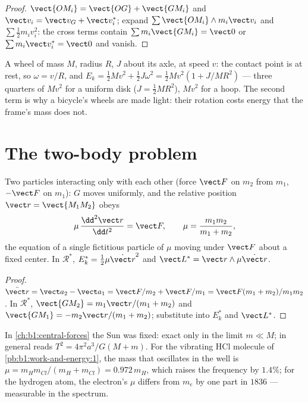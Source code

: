 \begin{proof}
$\vect{OM_i} = \vect{OG} + \vect{GM_i}$ and $\vect v_i = \vect v_G + \vect v_i^*$;
expand $\sum\vect{OM_i}\wedge m_i\vect v_i$ and $\sum\tfrac12 m_iv_i^2$: the cross
terms contain $\sum m_i\vect{GM_i} = \vect 0$ or $\sum m_i\vect v_i^* = \vect 0$
and vanish.
\end{proof}

\begin{example}\label{ex:b1:systems-of-points:rolling}
A wheel of mass $M$, radius $R$,  $J$ about its axle,
 at speed $v$: the contact point is at rest, so
$\omega = v/R$, and $E_k = \tfrac12 Mv^2 + \tfrac12 J\omega^2 = \tfrac12 Mv^2(1 +
J/MR^2)$ --- three quarters of $Mv^2$ for a uniform disk ($J = \tfrac12 MR^2$),
$Mv^2$ for a hoop. The second term is why a bicycle's wheels are made
light: their rotation costs energy that the frame's mass does not.
\end{example}

\section{The two-body problem}

\begin{proposition}\label{prop:b1:systems-of-points:twobody}
Two particles interacting only with each other (force $\vect F$ on $m_2$
from $m_1$, $-\vect F$ on $m_1$): $G$ moves uniformly, and the relative
position $\vect r = \vect{M_1M_2}$ obeys
\[
\mu\,\frac{\dd^2\vect r}{\dd t^2} = \vect F, \qquad \mu = \frac{m_1m_2}{m_1 + m_2},
\]
the equation of a single fictitious particle of \emph{} $\mu$
moving under $\vect F$ about a fixed center. In $\mathcal R^*$, $E_k^* =
\tfrac12\mu\dot{\vect r}^2$ and $\vect L^* = \vect r\wedge\mu\dot{\vect r}$.
\end{proposition}

\begin{proof}
$\ddot{\vect r} = \vect a_2 - \vect a_1 = \vect F/m_2 + \vect F/m_1 = \vect F(m_1 +
m_2)/m_1m_2$. In $\mathcal R^*$, $\vect{GM_2} = m_1\vect r/(m_1 + m_2)$ and
$\vect{GM_1} = -m_2\vect r/(m_1 + m_2)$; substitute into $E_k^*$ and $\vect L^*$.
\end{proof}

\begin{example}\label{ex:b1:systems-of-points:reduced}
In \cref{ch:b1:central-forces} the Sun was fixed: exact only in the
limit $m \ll M$; in general  reads $T^2 = 4\pi^2a^3/G(M +
m)$. For the vibrating HCl molecule of \cref{pb:b1:work-and-energy:1},
the mass that oscillates in the well is $\mu = m_Hm_{Cl}/(m_H + m_{Cl}) =
0.972\,m_H$, which raises the frequency by $1.4\%$; for the hydrogen
atom, the electron's $\mu$ differs from $m_e$ by one part in $1836$ ---
measurable in the spectrum.
\end{example}

